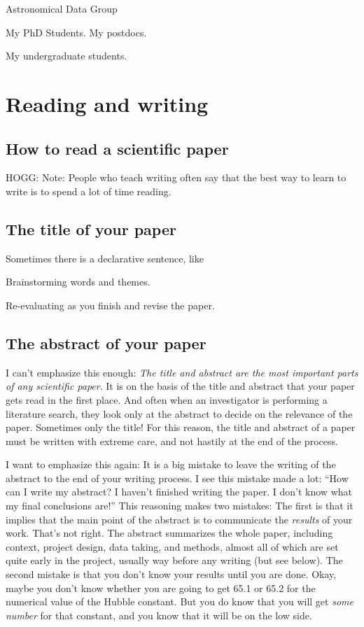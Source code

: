 \documentclass[letterpaper]{book}
\begin{document}
Astronomical Data Group

My PhD Students. My postdocs.

My undergraduate students.

\part{Reading and writing}%

\chapter{How to read a scientific paper}\label{ch:reading}

HOGG: Note: People who teach writing often say that the best way to learn to write is to spend a lot of time reading.

\chapter{The title of your paper}\label{ch:title}

Sometimes there is a declarative sentence, like

Brainstorming words and themes.

Re-evaluating as you finish and revise the paper.

\chapter{The abstract of your paper}\label{ch:abstract}

I can't emphasize this enough: \emph{The title and abstract are the most important parts of any scientific paper}.
It is on the basis of the title and abstract that your paper gets read in the first place.
And often when an investigator is performing a literature search, they look only at the abstract to decide on the relevance of the paper.
Sometimes only the title!
For this reason, the title and abstract of a paper must be written with extreme care, and not hastily at the end of the process.

I want to emphasize this again: It is a big mistake to leave the writing of the abstract to the end of your writing process.
I see this mistake made a lot:
``How can I write my abstract? I haven't finished writing the paper. I don't know what my final conclusions are!''
This reasoning makes two mistakes:
The first is that it implies that the main point of the abstract is to communicate the \emph{results} of your work.
That's not right.
The abstract summarizes the whole paper, including context, project design, data taking, and methods, almost all of which are set quite early in the project, usually way before any writing (but see below).
The second mistake is that you don't know your results until you are done.
Okay, maybe you don't know whether you are going to get 65.1 or 65.2 for the numerical value of the Hubble constant.
But you do know that you will get \emph{some number} for that constant, and you know that it will be on the low side.
\end{document}
